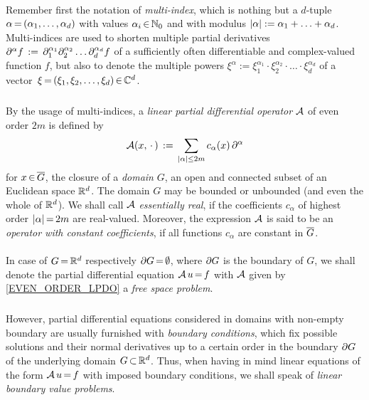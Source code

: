 \documentclass[11pt,twoside]{article}
\def\G{G}
\begin{document}
\paragraph{} %
Remember first the notation of \textit{multi-index},
which is nothing but a $d$-tuple $\alpha {\,=\,} (\alpha_1,\ldots,\alpha_d)$
with values $\alpha_i {\,\in\,} {\mathbb{N}}_0$
and with modulus $\abs{\alpha} := \alpha_1 + \ldots + \alpha_d$.
Multi-indices are used to shorten multiple partial derivatives
$
\partial^{\alpha} f \,:=\, \partial_1^{\alpha_1}
         \partial_2^{\alpha_2} \ldots
         \partial_d^{\alpha_d} f
$
of a sufficiently often differentiable and complex-valued function $f$,
but also to denote the multiple powers
$\xi^{\alpha} := \xi_1^{\alpha_1}
\cdot \xi_2^{\alpha_2} \cdot \ldots \cdot \xi_d^{\alpha_d}$
of a vector $\,\xi {\,=\,} (\xi_1,\xi_2,\ldots,\xi_d) {\,\in\,} {\mathbb{C}}^d$.

\subparagraph{}
By the usage of multi-indices,
a \textit{linear partial differential operator} ${\mathcal{A}}$ of even order $2m$
is defined by
\begin{equation}\label{EVEN_ORDER_LPDO}
\A(x,\,\cdot\,) \eqdef
\sum_{\abs{\alpha} \leq 2m} c_{\alpha}(x) \, \PA
\end{equation}
for $x \xeof \clG$,
the closure of a \textit{domain} $\G$,
{\ie} an open and connected subset of an Euclidean space ${\mathbb{R}}^d$.
The domain $\G$ may be bounded or unbounded (and even the whole of ${\mathbb{R}}^d$).
We shall call ${\mathcal{A}}$ \textit{essentially real},
if the coefficients $c_{\alpha}$ of highest order $\abs{\alpha} \eq 2m$
are real-valued.
Moreover,
the expression ${\mathcal{A}}$ is said to be
an \textit{operator with constant coefficients},
if all functions $c_{\alpha}$ are constant in $\clG$.

\paragraph{} %
In case of $\G \eq \Rd$ respectively $\bndG \eq \emptyset$,
where $\bndG$ is the boundary of $\G$,
we shall denote the partial differential equation ${\mathcal{A}} \, u {\,=\,} f$
with ${\mathcal{A}}$ given by \eqref{EVEN_ORDER_LPDO} a \textit{free space problem}.

\subparagraph{} %
However,
partial differential equations considered in domains with non-empty boundary
are usually furnished with \textit{boundary conditions},
which fix possible solutions and their normal derivatives up to a certain order
in the boundary $\bndG$ of the underlying domain $\G \xsubset \Rd$.
Thus,
when having in mind linear equations of the form ${\mathcal{A}}\,u {\,=\,} f$
with imposed boundary conditions,
we shall speak of \textit{linear boundary value problems}.
\end{document}
